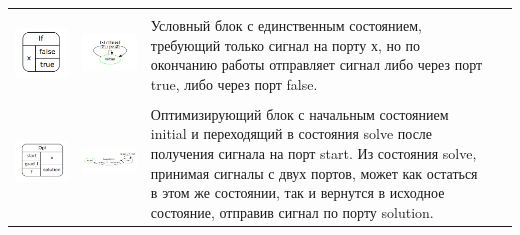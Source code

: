 \documentclass[a4paper,12pt]{article}
\begin{document}
\begin{table}[!hp]
\begin{tabular}{c|c|>{\centering}m{5cm} l}
\\ \hline 
\\
\includegraphics[scale=0.35]{if_block.png}&
\includegraphics[scale=0.55]{if_fa.png}&
\footnotesize{Условный блок с единственным состоянием, требующий только сигнал на порту х, но по окончанию работы отправляет сигнал либо через порт true, либо через порт false.\\} & ~
\\  
\hline 
\\
\includegraphics[scale=0.25]{opt_block.png}&
\includegraphics[scale=0.4]{opt_fa2.png}& 
\footnotesize{ Оптимизирующий блок с начальным состоянием initial и переходящий в состояния solve после получения сигнала на порт start. Из состояния solve, принимая сигналы с двух портов, может как остаться в этом же состоянии, так и вернутся в исходное состояние, отправив сигнал по порту solution.\\} & ~
\\ \hline


\end{tabular}
\end{table}
\end{document}
